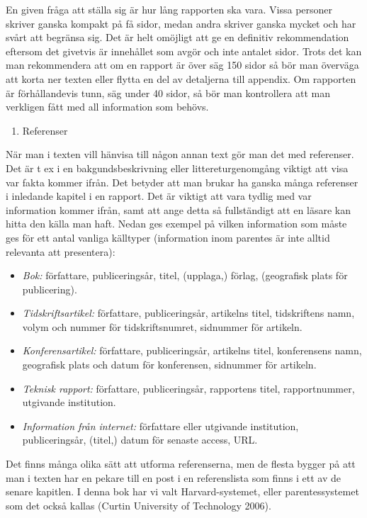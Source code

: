 En given fråga att ställa sig är hur lång rapporten ska vara. Vissa
personer skriver ganska kompakt på få sidor, medan andra skriver ganska
mycket och har svårt att begränsa sig. Det är helt omöjligt att ge en
definitiv rekommendation eftersom det givetvis är innehållet som avgör
och inte antalet sidor. Trots det kan man rekommendera att om en rapport
är över säg 150 sidor så bör man överväga att korta ner texten eller
flytta en del av detaljerna till appendix. Om rapporten är
förhållandevis tunn, säg under 40 sidor, så bör man kontrollera att man
verkligen fått med all information som behövs.

\begin{enumerate}
\def\labelenumi{\arabic{enumi}.}
\item
  Referenser
\end{enumerate}

När man i texten vill hänvisa till någon annan text gör man det med
referenser. Det är t ex i en bakgundsbeskrivning eller
littereturgenomgång viktigt att visa var fakta kommer ifrån. Det betyder
att man brukar ha ganska många referenser i inledande kapitel i en
rapport. Det är viktigt att vara tydlig med var information kommer
ifrån, samt att ange detta så fullständigt att en läsare kan hitta den
källa man haft. Nedan ges exempel på vilken information som måste ges
för ett antal vanliga källtyper (information inom parentes är inte
alltid relevanta att presentera):

\begin{itemize}
\item
  \emph{Bok:} författare, publiceringsår, titel, (upplaga,) förlag,
  (geografisk plats för publicering).
\item
  \emph{Tidskriftsartikel:} författare, publiceringsår, artikelns titel,
  tidskriftens namn, volym och nummer för tidskriftsnumret, sidnummer
  för artikeln.
\item
  \emph{Konferensartikel:} författare, publiceringsår, artikelns titel,
  konferensens namn, geografisk plats och datum för konferensen,
  sidnummer för artikeln.
\item
  \emph{Teknisk rapport:} författare, publiceringsår, rapportens titel,
  rapportnummer, utgivande institution.
\item
  \emph{Information från internet:} författare eller utgivande
  institution, publiceringsår, (titel,) datum för senaste access, URL.
\end{itemize}

Det finns många olika sätt att utforma referenserna, men de flesta
bygger på att man i texten har en pekare till en post i en referenslista
som finns i ett av de senare kapitlen. I denna bok har vi valt
Harvard-systemet, eller parentessystemet som det också kallas (Curtin
University of Technology 2006).

